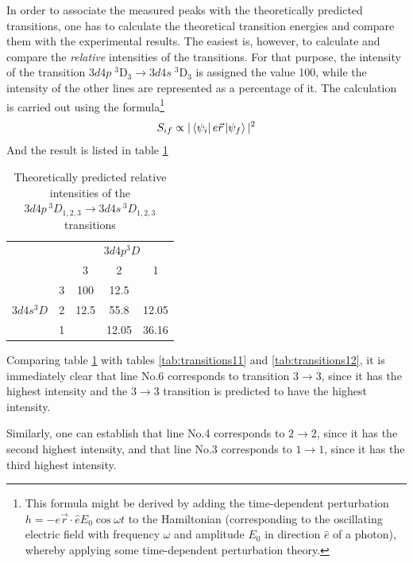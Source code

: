 \documentclass[a4paper]{article}
\begin{document}
In order to associate the measured peaks with the theoretically
predicted transitions, one has to calculate the theoretical transition
energies and compare them with the experimental results. The
easiest is, however, to calculate and compare the {\it relative}
intensities of the transitions. For that purpose, the intensity of the
transition $3d4p\;^3\mathrm{D}_3 \to 3d4s\;^3\mathrm{D}_3$ is assigned
the value 100, while the intensity of the other lines are represented
as a percentage of it. The calculation is carried out using the
formula\footnote{This formula might be derived by adding the time-dependent perturbation $h=-e \vec{r} \cdot \hat{e} E_0 \cos{\omega t}$ to the Hamiltonian (corresponding to the oscillating electric field with frequency $\omega$ and amplitude $E_0$ in direction $\hat{e}$ of a photon), whereby applying some time-dependent perturbation theory.} 
\[
S_{if} \propto |\matrixel{\psi_i}{e\vec{r}}{\psi_f}|^2
\]
And the result is listed in table \ref{tab:intensity1}
\begin{table}[htb!]
\centering
\begin{tabular}{cc|c|c|c|}
\cline{3-5}
& & \multicolumn{3}{c|}{$3d4p ^3D$}\\
\cline{3-5}
& & 3 & 2 & 1\\
\hline
\multicolumn{1}{|c|}{\multirow{3}{*}{$3d4s ^3D$}} & 3 & 100 & 12.5 & \\
\multicolumn{1}{|c|}{} & 2 & 12.5 & 55.8 & 12.05 \\
\multicolumn{1}{|c|}{} & 1 & & 12.05 & 36.16 \\
\hline
\end{tabular}
\caption{Theoretically predicted relative intensities of the
  $3d4p\,^3D_{1,2,3} \to 3d4s\,^3D_{1,2,3}$ transitions}
\label{tab:intensity1}
\end{table}

Comparing table \ref{tab:intensity1} with tables \ref{tab:transitions11} and \ref{tab:transitions12},
it is immediately clear that line No.6 corresponds to transition $3
\to 3$, since it has the highest intensity and the $3 \to 3$
transition is predicted to have the highest intensity.

Similarly, one can establish that line No.4 corresponds to $2 \to 2$,
since it has the second highest intensity, and that line No.3
corresponds to $1 \to 1$, since it has the third highest intensity.
\end{document}
